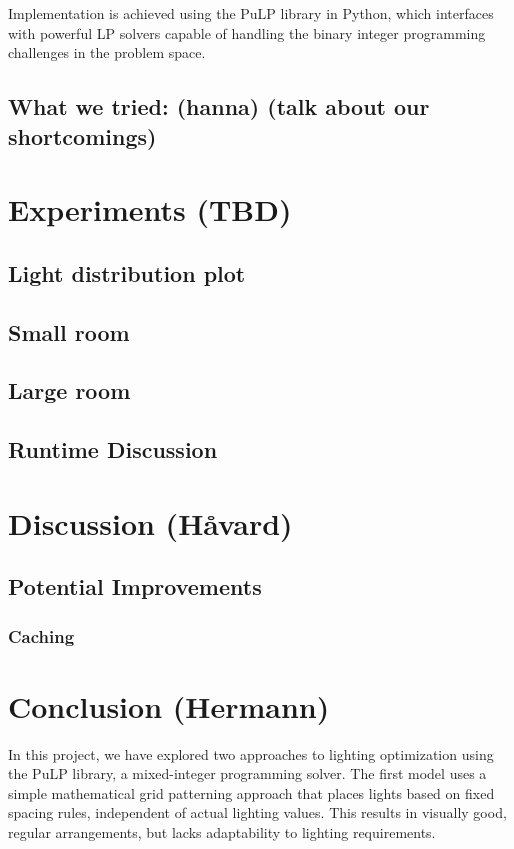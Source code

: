 \documentclass{article}
\begin{document}
Implementation is achieved using the PuLP library in Python, which interfaces with powerful LP solvers capable of handling the binary 
integer programming challenges in the problem space.

\subsection{What we tried: (hanna) (talk about our shortcomings)}

\newpage

\section{Experiments (TBD)}
\subsection{Light distribution plot}
\subsection{Small room}
\subsection{Large room}
\subsection{Runtime Discussion}



\newpage

\section{Discussion (Håvard)}

\subsection{Potential Improvements}
\subsubsection{Caching}

\newpage

\section{Conclusion (Hermann)}

In this project, we have explored two approaches to lighting optimization using the PuLP library, a mixed-integer programming solver.
The first model uses a simple mathematical grid patterning approach that places lights based on fixed spacing rules, independent of actual lighting values.
This results in visually good, regular arrangements, but lacks adaptability to lighting requirements.
\end{document}
